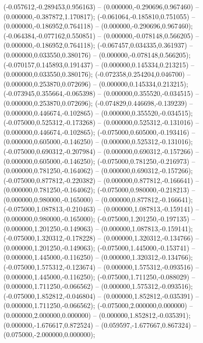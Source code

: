  (-0.057612,-0.289453,0.956163) -- (0.000000,-0.290696,0.967460) -- (0.000000,-0.387872,1.170817);
 (-0.061064,-0.185810,0.751055) -- (0.000000,-0.186952,0.764118) -- (0.000000,-0.290696,0.967460);
 (-0.064384,-0.077162,0.550851) -- (0.000000,-0.078148,0.566205) -- (0.000000,-0.186952,0.764118);
 (-0.067457,0.034335,0.361937) -- (0.000000,0.033550,0.380176) -- (0.000000,-0.078148,0.566205);
 (-0.070157,0.145893,0.191437) -- (0.000000,0.145334,0.213215) -- (0.000000,0.033550,0.380176);
 (-0.072358,0.254204,0.046700) -- (0.000000,0.253870,0.072696) -- (0.000000,0.145334,0.213215);
 (-0.073945,0.355664,-0.065398) -- (0.000000,0.355520,-0.034515) -- (0.000000,0.253870,0.072696);
 (-0.074829,0.446698,-0.139239) -- (0.000000,0.446674,-0.102865) -- (0.000000,0.355520,-0.034515);
 (-0.075000,0.525312,-0.173268) -- (0.000000,0.525312,-0.131016) -- (0.000000,0.446674,-0.102865);
 (-0.075000,0.605000,-0.193416) -- (0.000000,0.605000,-0.146250) -- (0.000000,0.525312,-0.131016);
 (-0.075000,0.690312,-0.207984) -- (0.000000,0.690312,-0.157266) -- (0.000000,0.605000,-0.146250);
 (-0.075000,0.781250,-0.216973) -- (0.000000,0.781250,-0.164062) -- (0.000000,0.690312,-0.157266);
 (-0.075000,0.877812,-0.220382) -- (0.000000,0.877812,-0.166641) -- (0.000000,0.781250,-0.164062);
 (-0.075000,0.980000,-0.218213) -- (0.000000,0.980000,-0.165000) -- (0.000000,0.877812,-0.166641);
 (-0.075000,1.087813,-0.210463) -- (0.000000,1.087813,-0.159141) -- (0.000000,0.980000,-0.165000);
 (-0.075000,1.201250,-0.197135) -- (0.000000,1.201250,-0.149063) -- (0.000000,1.087813,-0.159141);
 (-0.075000,1.320312,-0.178228) -- (0.000000,1.320312,-0.134766) -- (0.000000,1.201250,-0.149063);
 (-0.075000,1.445000,-0.153741) -- (0.000000,1.445000,-0.116250) -- (0.000000,1.320312,-0.134766);
 (-0.075000,1.575312,-0.123674) -- (0.000000,1.575312,-0.093516) -- (0.000000,1.445000,-0.116250);
 (-0.075000,1.711250,-0.088029) -- (0.000000,1.711250,-0.066562) -- (0.000000,1.575312,-0.093516);
 (-0.075000,1.852812,-0.046804) -- (0.000000,1.852812,-0.035391) -- (0.000000,1.711250,-0.066562);
 (-0.075000,2.000000,0.000000) -- (0.000000,2.000000,0.000000) -- (0.000000,1.852812,-0.035391);
 (0.000000,-1.676617,0.872524) -- (0.059597,-1.677667,0.867324) -- (0.075000,-2.000000,0.000000);
